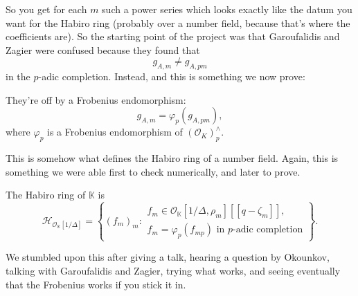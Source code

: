 \documentclass[reqno]{amsart} 
\begin{document}
So you get for each $m$ such a power series which looks exactly like the datum you want for the Habiro ring (probably over a number field, because that's where the coefficients are).  So the starting point of the project was that Garoufalidis and Zagier were confused because they found that
\begin{equation*}
  g_{A, m} \neq g_{A, p m}
\end{equation*}
in the $p$-adic completion.  Instead, and this is something we now prove:
\begin{theorem}[GSWZ]
  They're off by a Frobenius endomorphism:
  \begin{equation*}
    g_{A, m} = \varphi_p(g_{A, p m}),
  \end{equation*}
  where $\varphi_p$ is a Frobenius endomorphism of $(\mathcal{O}_K)^\wedge_p$.
\end{theorem}
This is somehow what defines the Habiro ring of a number field.  Again, this is something we were able first to check numerically, and later to prove.
\begin{definition}
  The Habiro ring of $\mathbb{K}$ is
  \begin{equation*}
    \mathcal{H}_{\mathcal{O}_{\mathbb{K}}[1/\Delta]}
    = \left\{(f_m)_m :
      \begin{array}{l}
        f_m \in \mathcal{O}_{\mathbb{K}}[1/\Delta, \rho_m][[q - \zeta_m]], \\
        f_m = \varphi_p(f_{mp}) \text{ in $p$-adic completion}
      \end{array}
    \right\}.
  \end{equation*}
\end{definition}
We stumbled upon this after giving a talk, hearing a question by Okounkov, talking with Garoufalidis and Zagier, trying what works, and seeing eventually that the Frobenius works if you stick it in.
\end{document}
